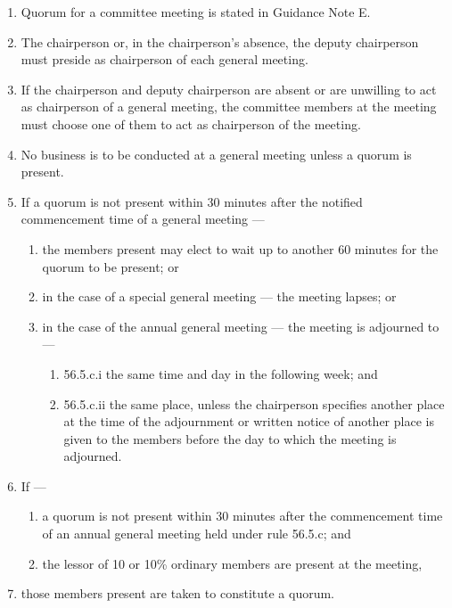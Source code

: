 \documentclass[../constitution.tex]{subfiles}
\begin{document}
\begin{enumerate}

\item Quorum for a committee meeting is stated in Guidance Note E.
\item The chairperson or, in the chairperson's absence, the deputy chairperson must preside as chairperson of each general meeting.
\item If the chairperson and deputy chairperson are absent or are unwilling to act as chairperson of a general meeting, the committee members at the meeting must choose one of them to act as chairperson of the meeting.
\item No business is to be conducted at a general meeting unless a quorum is present.
\item If a quorum is not present within 30 minutes after the notified commencement time of a general meeting ---

  \begin{enumerate}
  
  \item the members present may elect to wait up to another 60 minutes for the quorum to be present; or
  \item in the case of a special general meeting --- the meeting lapses; or
  \item in the case of the annual general meeting --- the meeting is adjourned to ---

    \begin{enumerate}
    
    \item 56.5.c.i the same time and day in the following week; and
    \item 56.5.c.ii the same place, unless the chairperson specifies another place at the time of the adjournment or written notice of another place is given to the members before the day to which the meeting is adjourned.
    \end{enumerate}
  \end{enumerate}
\item If ---

  \begin{enumerate}
  
  \item a quorum is not present within 30 minutes after the commencement time of an annual general meeting held under rule 56.5.c; and
  \item the lessor of 10 or 10\% ordinary members are present at the meeting,
  \end{enumerate}
\item those members present are taken to constitute a quorum.
\end{enumerate}
\end{document}
